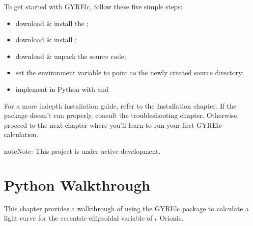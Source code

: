 \documentclass[letterpaper,10pt,english]{sphinxmanual}
\begin{document}
\sphinxAtStartPar
To get started with GYRE\sphinxhyphen{}lc, follow these five simple steps:
\begin{itemize}
\item {} 
\sphinxAtStartPar
download \& install the ;

\item {} 
\sphinxAtStartPar
download \& install ;

\item {} 
\sphinxAtStartPar
download \& unpack the  source code;

\item {} 
\sphinxAtStartPar
set the  environment variable to point to the newly created source directory;

\item {} 
\sphinxAtStartPar
implement in Python with  and 

\end{itemize}

\sphinxAtStartPar
For a more in\sphinxhyphen{}depth installation guide, refer to the Installation chapter. If the package doesn’t run properly, consult the troubleshooting chapter. Otherwise, proceed to the next chapter where you’ll learn to run your first GYRE\sphinxhyphen{}lc calculation.

\begin{sphinxadmonition}{note}{Note:}
\sphinxAtStartPar
This project is under active development.
\end{sphinxadmonition}
\label{\detokenize{user-guide/python-walkthrough:python-walkthrough}}

\chapter{Python Walkthrough}
\label{\detokenize{user-guide/python-walkthrough:id1}}\label{\detokenize{user-guide/python-walkthrough::doc}}
\sphinxAtStartPar
This chapter provides a walkthrough of using the GYRE\sphinxhyphen{}lc package to calculate a light curve for the eccentric ellipsoidal variable of \({\iota}\) Orionis.
\end{document}
